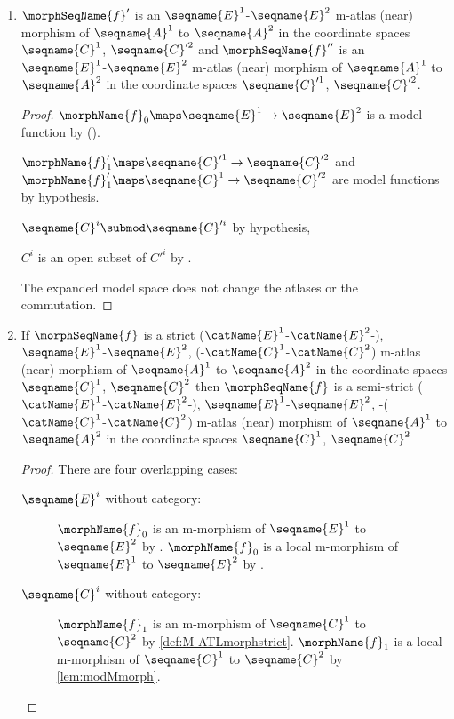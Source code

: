 \documentclass{article}
\begin{document}
\begin{lemma}
\begin{enumerate}
\item
\label{M-ATLmorph:istosup}
$\morphSeqName{f}'$ is an $\seqname{E}^1$-$\seqname{E}^2$ m-atlas (near)
morphism of $\seqname{A}^1$ to $\seqname{A}^2$ in the coordinate spaces
$\seqname{C}^1$, $\seqname{C}'^2$ and $\morphSeqName{f}''$ is an
$\seqname{E}^1$-$\seqname{E}^2$ m-atlas (near) morphism of
$\seqname{A}^1$ to $\seqname{A}^2$ in the coordinate spaces
$\seqname{C}'^1$, $\seqname{C}'^2$.

\begin{proof}
$\morphName{f}_0 \maps \seqname{E}^1 \to \seqname{E}^2$ is a model
function by 
().

$\morphName{f}'_1 \maps \seqname{C}'^1 \to \seqname{C}'^2$ and
$\morphName{f}'_1 \maps \seqname{C}^1 \to \seqname{C}'^2$ are model
functions by hypothesis.

$\seqname{C}^i \submod \seqname{C}'^i$ by hypothesis,

$C^i$ is an open subset of $C'^i$ by .

The expanded model space does not change the atlases or the commutation.
\end{proof}

\item
\label{M-ATLmorph:strictissemi}
If $\morphSeqName{f}$ is a strict
\nobreaks
  {
    {($\catName{E}^1$-$\catName{E}^2$-)},
    {$\seqname{E}^1$-$\seqname{E}^2$},
    {(-$\catName{C}^1$-$\catName{C}^2$)}
  }
m-atlas (near) morphism of $\seqname{A}^1$ to $\seqname{A}^2$ in the
coordinate spaces $\seqname{C}^1$, $\seqname{C}^2$ then
$\morphSeqName{f}$ is a semi-strict
\nobreaks
  {
    {($\catName{E}^1$-$\catName{E}^2$-)},
    {$\seqname{E}^1$-$\seqname{E}^2$},
    {-($\catName{C}^1$-$\catName{C}^2$)}
  }
m-atlas (near) morphism of $\seqname{A}^1$ to $\seqname{A}^2$ in the
coordinate spaces $\seqname{C}^1$, $\seqname{C}^2$

\begin{proof}
There are four overlapping cases:
\begin{description}
\item[$\seqname{E}^i$ without category:]
$\morphName{f}_0$ is an m-morphism of $\seqname{E}^1$ to $\seqname{E}^2$
by . $\morphName{f}_0$ is a local
m-morphism of $\seqname{E}^1$ to $\seqname{E}^2$ by
.

\item[$\seqname{C}^i$ without category:]
$\morphName{f}_1$ is an m-morphism of $\seqname{C}^1$ to $\seqname{C}^2$
by \cref{def:M-ATLmorphstrict}. $\morphName{f}_1$ is a local m-morphism
of $\seqname{C}^1$ to $\seqname{C}^2$ by \cref{lem:modMmorph}.


\end{description}
\end{proof}
\end{enumerate}
\end{lemma}
\end{document}
